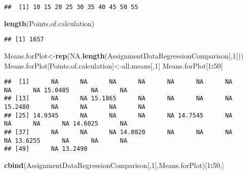 \documentclass[]{article}
\newenvironment{Shaded}{\begin{snugshade}}{\end{snugshade}}
\newcommand{\KeywordTok}[1]{\textcolor[rgb]{0.13,0.29,0.53}{\textbf{#1}}}
\newcommand{\DecValTok}[1]{\textcolor[rgb]{0.00,0.00,0.81}{#1}}
\newcommand{\OtherTok}[1]{\textcolor[rgb]{0.56,0.35,0.01}{#1}}
\newcommand{\OperatorTok}[1]{\textcolor[rgb]{0.81,0.36,0.00}{\textbf{#1}}}
\newcommand{\NormalTok}[1]{#1}
\begin{document}
\begin{verbatim}
##  [1] 10 15 20 25 30 35 40 45 50 55
\end{verbatim}

\begin{Shaded}
\begin{Highlighting}[]
\KeywordTok{length}\NormalTok{(Points.of.calculation)}
\end{Highlighting}
\end{Shaded}

\begin{verbatim}
## [1] 1657
\end{verbatim}

\begin{Shaded}
\begin{Highlighting}[]
\NormalTok{Means.forPlot<-}\KeywordTok{rep}\NormalTok{(}\OtherTok{NA}\NormalTok{,}\KeywordTok{length}\NormalTok{(AssignmentDataRegressionComparison[,}\DecValTok{1}\NormalTok{]))}
\NormalTok{Means.forPlot[Points.of.calculation]<-all.means[,}\DecValTok{1}\NormalTok{]}
\NormalTok{Means.forPlot[}\DecValTok{1}\OperatorTok{:}\DecValTok{50}\NormalTok{]}
\end{Highlighting}
\end{Shaded}

\begin{verbatim}
##  [1]      NA      NA      NA      NA      NA      NA      NA      NA      NA 15.0405      NA      NA
## [13]      NA      NA 15.1865      NA      NA      NA      NA 15.2480      NA      NA      NA      NA
## [25] 14.9345      NA      NA      NA      NA 14.7545      NA      NA      NA      NA 14.6025      NA
## [37]      NA      NA      NA 14.0820      NA      NA      NA      NA 13.6255      NA      NA      NA
## [49]      NA 13.2490
\end{verbatim}

\begin{Shaded}
\begin{Highlighting}[]
\KeywordTok{cbind}\NormalTok{(AssignmentDataRegressionComparison[,}\DecValTok{1}\NormalTok{],Means.forPlot)[}\DecValTok{1}\OperatorTok{:}\DecValTok{50}\NormalTok{,]}
\end{Highlighting}
\end{Shaded}
\end{document}
